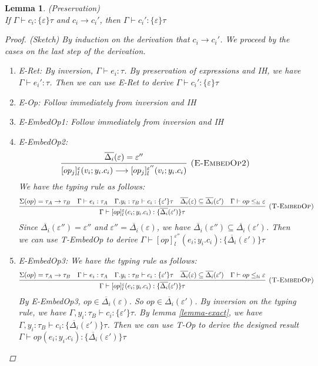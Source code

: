\documentclass{article}
\newtheorem{lemma}[theorem]{Lemma}
\theoremstyle{definition}
\begin{document}
\begin{lemma} (Preservation) \\
If $\Gamma \vdash c_i : \{\varepsilon\} \tau$ and $c_i \longrightarrow c_i'$, then $\Gamma \vdash c_i' : \{\varepsilon\}\tau$

\begin{proof} (Sketch)
By induction on the derivation that $c_i \longrightarrow c_i'$. We proceed by the cases on the last step of the derivation.

\begin{enumerate}
\item E-Ret: By inversion, $\Gamma \vdash e_i: \tau$. By preservation of expressions and IH, we have  $\Gamma \vdash e_i': \tau$. Then we can use E-Ret to derive $\Gamma  \vdash c_i' : \{\varepsilon\} \tau$
\item E-Op: Follow immediately from inversion and IH
\item E-EmbedOp1: Follow immediately from inversion and IH
\item E-EmbedOp2:  
$$\infer[\textsc{(E-EmbedOp2)}]
{[op_j]^\varepsilon_l(v_i; y_i.c_i) \longrightarrow [op_j]^{\varepsilon''}_l(v_i; y_i.c_i) }
{\overline{\Delta_i}(\varepsilon) = \varepsilon''} \quad $$
We have the typing rule as follows:
$$\infer[\textsc{(T-EmbedOp)}]
  {\Gamma\vdash [op]^\varepsilon_l(e_i; y_i.c_i) : \{\overline{\Delta_i}(\varepsilon')\}\tau }
  {\Sigma(op) = \tau_A \rightarrow \tau_B & \Gamma \vdash e_i : \tau_A & \Gamma. y_i:\tau_B\vdash c_i: \{\varepsilon'\}\tau & \overline{\Delta_i}(\varepsilon) \subseteq \overline{\Delta_i}(\varepsilon') & \Gamma \vdash op \leq_{li} \varepsilon}  $$
  Since $\overline{\Delta_i}(\varepsilon'') = \varepsilon''$ and $\varepsilon'' = \overline{\Delta_i}(\varepsilon)$, we have $\overline{\Delta_i}(\varepsilon'')  \subseteq \overline{\Delta_i}(\varepsilon')$. Then we can use T-EmbedOp to derive $\Gamma\vdash [op]^{\varepsilon''}_l(e_i; y_i.c_i) : \{\overline{\Delta_i}(\varepsilon')\}\tau $
\item E-EmbedOp3:
  We have the typing rule as follows:
$$\infer[\textsc{(T-EmbedOp)}]
  {\Gamma\vdash [op]^\varepsilon_l(e_i; y_i.c_i) : \{\overline{\Delta_i}(\varepsilon')\}\tau }
  {\Sigma(op) = \tau_A \rightarrow \tau_B & \Gamma \vdash e_i : \tau_A & \Gamma. y_i:\tau_B\vdash c_i: \{\varepsilon'\}\tau & \overline{\Delta_i}(\varepsilon) \subseteq \overline{\Delta_i}(\varepsilon') & \Gamma \vdash op \leq_{li} \varepsilon}  $$
  By E-EmbedOp3, $op \in \overline{\Delta_i}(\varepsilon)$. So $op \in \overline{\Delta_i}(\varepsilon')$. 
By inversion on the typing rule, we have $\Gamma, y_i:\tau_B\vdash c_i: \{\varepsilon'\}\tau$. By lemma \ref{lemma-exact}, we have $\Gamma, y_i:\tau_B\vdash c_i: \{\overline{\Delta_i}(\varepsilon')\}\tau$. Then we can use T-Op to derive the designed result $\Gamma \vdash op(e_i; y_i.c_i) : \{\overline{\Delta_i}(\varepsilon')\}\tau $


\end{enumerate}
\end{proof}
\end{lemma}
\end{document}
